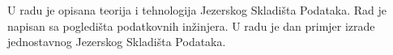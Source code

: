 \begin{sazetak}

U radu je opisana teorija i tehnologija Jezerskog Skladišta Podataka. Rad je
napisan sa pogledišta podatkovnih inžinjera. U radu je dan primjer
izrade jednostavnog Jezerskog Skladišta Podataka.

\end{sazetak}